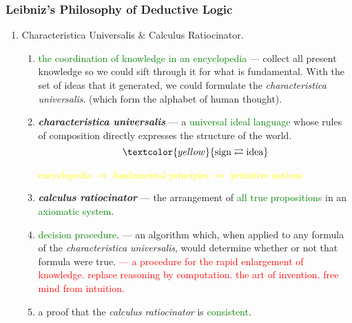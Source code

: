 \documentclass[UTF8,11pt,colorlinks,compress,openany]{beamer}%
\begin{document}
\begin{frame}\frametitle{Leibniz's Philosophy of Deductive Logic}
		\begin{enumerate}[1]
			\item Characteristica Universalis \& Calculus Ratiocinator.
			\begin{enumerate}[i]
				\item \textcolor{green}{the coordination of knowledge in an encyclopedia} --- collect all present knowledge so we could sift through it for what is fundamental. With the set of ideas that it generated, we could formulate the \emph{characteristica universalis}. (which form the alphabet of human thought).
				\item \emph{\textbf{characteristica universalis}} --- a \textcolor{green}{universal ideal language} whose rules of composition directly expresses the structure of the world.
					\[\textcolor{yellow}{\text{sign}\rightleftarrows\text{idea}}\]
					\begin{center}
						{\footnotesize \textcolor{yellow}{
								encyclopedia $\Rightarrow$ fundamental principles $\Rightarrow$ primitive notions}}
					\end{center}
				\item \emph{\textbf{calculus ratiocinator}} --- the arrangement of \textcolor{green}{all true propositions} in an \textcolor{green}{axiomatic system}.
				\item \textcolor{green}{decision procedure}. --- an algorithm which, when applied to any formula of the \emph{characteristica universalis}, would determine whether or not that formula were true. \textcolor{red}{--- a procedure for the rapid enlargement of knowledge. replace reasoning by computation. the art of invention. free mind from intuition.}
				\item a proof that the \emph{calculus ratiocinator} is \textcolor{green}{consistent}.
			\end{enumerate}
		\end{enumerate}
\end{frame}
\end{document}
